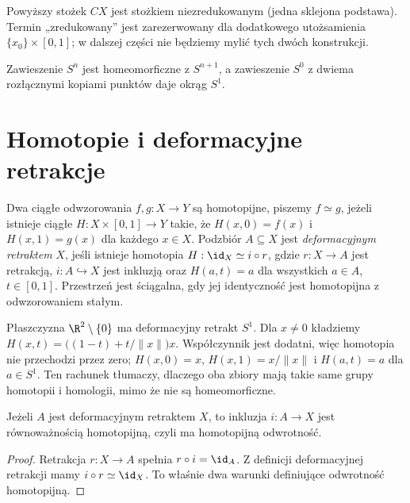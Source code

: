\begin{uwaga}
Powyższy stożek $CX$ jest stożkiem niezredukowanym (jedna sklejona
podstawa). Termin „zredukowany” jest zarezerwowany dla dodatkowego
utożsamienia $\{x_0\}\times[0,1]$; w dalszej części nie będziemy
mylić tych dwóch konstrukcji.
\end{uwaga}

\begin{przyklad}
Zawieszenie $S^n$ jest homeomorficzne z $S^{n+1}$, a zawieszenie $S^0$
z dwiema rozłącznymi kopiami punktów daje okrąg $S^1$.
\end{przyklad}

\section{Homotopie i deformacyjne retrakcje}

\begin{definicja}
Dwa ciągłe odwzorowania $f,g:X\to Y$ są homotopijne, piszemy
$f\simeq g$, jeżeli istnieje ciągłe $H:X\times[0,1]\to Y$ takie, że
$H(x,0)=f(x)$ i $H(x,1)=g(x)$ dla każdego $x\in X$.
Podzbiór $A\subseteq X$ jest \emph{deformacyjnym retraktem} $X$, jeśli
istnieje homotopia $H:\id_X\simeq i\circ r$, gdzie $r:X\to A$ jest
retrakcją, $i:A\hookrightarrow X$ jest inkluzją oraz
$H(a,t)=a$ dla wszystkich $a\in A$, $t\in[0,1]$.
Przestrzeń jest ściągalna, gdy jej identyczność jest homotopijna z
odwzorowaniem stałym.
\end{definicja}

\begin{przyklad}
Płaszczyzna $\R^2\setminus\{0\}$ ma deformacyjny retrakt $S^1$.
Dla $x\ne0$ kładziemy
$H(x,t)=\big((1-t)+t/\|x\|\big)x$.
Współczynnik jest dodatni, więc homotopia nie przechodzi przez zero;
$H(x,0)=x$, $H(x,1)=x/\|x\|$ i $H(a,t)=a$ dla $a\in S^1$.
Ten rachunek tłumaczy, dlaczego oba zbiory mają takie same grupy homotopii
i homologii, mimo że nie są homeomorficzne.
\end{przyklad}

\begin{twierdzenie}
Jeżeli $A$ jest deformacyjnym retraktem $X$, to inkluzja $i:A\to X$
jest równoważnością homotopijną, czyli ma homotopijną odwrotność.
\end{twierdzenie}
\begin{proof}
Retrakcja $r:X\to A$ spełnia $r\circ i=\id_A$.
Z definicji deformacyjnej retrakcji mamy $i\circ r\simeq\id_X$.
To właśnie dwa warunki definiujące odwrotność homotopijną.
\end{proof}

